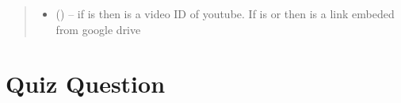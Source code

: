 \documentclass[letterpaper,10pt,english,openany,oneside]{sphinxmanual}
\begin{document}
\begin{fulllineitems}
\begin{quote}
\begin{description}
\begin{itemize}
\item {} 
\sphinxAtStartPar
{} () – if  is  then  is a video ID of youtube. If  is  or  then  is a link embeded from google drive

\end{itemize}

\end{description}\end{quote}

\end{fulllineitems}



\section{Quiz Question}
\label{\detokenize{api-training/v1:quiz-question}}
\end{document}
